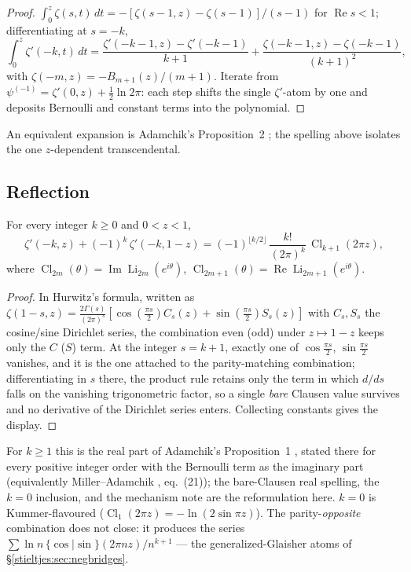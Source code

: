\begin{proof}
$\int_0^z\zeta(s,t)\,dt=-[\zeta(s-1,z)-\zeta(s-1)]/(s-1)$ for
$\operatorname{Re}s<1$; differentiating at $s=-k$,
\[
\int_0^z\zeta'(-k,t)\,dt
=\frac{\zeta'(-k-1,z)-\zeta'(-k-1)}{k+1}
+\frac{\zeta(-k-1,z)-\zeta(-k-1)}{(k+1)^2},
\]
with $\zeta(-m,z)=-B_{m+1}(z)/(m+1)$. Iterate from
$\psi^{(-1)}=\zeta'(0,z)+\tfrac12\ln2\pi$: each step shifts the single
$\zeta'$-atom by one and deposits Bernoulli and constant terms into the
polynomial.
\end{proof}

An equivalent expansion is Adamchik's Proposition~2 \cite{stieltjes:Adamchik98}; the
spelling above isolates the one $z$-dependent transcendental.

\subsection{Reflection}

\begin{theorem}\label{stieltjes:thm:negrefl}
For every integer $k\ge0$ and $0<z<1$,
\[
\zeta'(-k,z)+(-1)^k\,\zeta'(-k,1-z)
=(-1)^{\lfloor k/2\rfloor}\,\frac{k!}{(2\pi)^k}\,
\operatorname{Cl}_{k+1}(2\pi z),
\]
where $\operatorname{Cl}_{2m}(\theta)=\operatorname{Im}\operatorname{Li}_{2m}(e^{i\theta})$,
$\operatorname{Cl}_{2m+1}(\theta)=\operatorname{Re}\operatorname{Li}_{2m+1}(e^{i\theta})$.
\end{theorem}

\begin{proof}
In Hurwitz's formula, written as
$\zeta(1-s,z)=\tfrac{2\Gamma(s)}{(2\pi)^s}
[\cos(\tfrac{\pi s}{2})C_s(z)+\sin(\tfrac{\pi s}{2})S_s(z)]$ with
$C_s,S_s$ the cosine/sine Dirichlet series, the combination even (odd)
under $z\mapsto1-z$ keeps only the $C$ ($S$) term. At the integer
$s=k+1$, exactly one of $\cos\tfrac{\pi s}{2}$, $\sin\tfrac{\pi s}{2}$
vanishes, and it is the one attached to the parity-matching combination;
differentiating in $s$ there, the product rule retains only the term in
which $d/ds$ falls on the vanishing trigonometric factor, so a single
\emph{bare} Clausen value survives and no derivative of the Dirichlet
series enters. Collecting constants gives the display.
\end{proof}

For $k\ge1$ this is the real part of Adamchik's Proposition~1
\cite{stieltjes:Adamchik98}, stated there for every positive integer order with the
Bernoulli term as the imaginary part (equivalently Miller--Adamchik
\cite{stieltjes:MillerAdamchik}, eq.~(21)); the bare-Clausen real spelling, the
$k=0$ inclusion, and the mechanism note are the reformulation here. $k=0$
is Kummer-flavoured ($\operatorname{Cl}_1(2\pi z)=-\ln(2\sin\pi z)$). The
parity-\emph{opposite} combination does not close: it produces the series
$\sum\ln n\,\{\cos|\sin\}(2\pi nz)/n^{k+1}$ — the generalized-Glaisher
atoms of \S\ref{stieltjes:sec:negbridges}.

